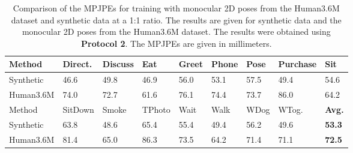 \begin{table}[]	
	\centering
	\begin{tabularx}{\textwidth}{l *{8}{Y}}
		\toprule
		Method & Direct. & Discuss & Eat & Greet & Phone & Pose & Purchase & Sit \\
		\midrule
		Synthetic & 46.6 & 49.8 & 46.9 & 56.0 & 53.1 & 57.5 & 49.4 & 54.6 \\
		Human3.6M & 74.0 & 72.7 & 61.6 & 76.1 & 74.4 & 73.7 & 86.0 & 64.2 \\
		\bottomrule
		\toprule
		Method & SitDown & Smoke & TPhoto & Wait & Walk & WDog & WTog. & \textbf{Avg.}\\
		\midrule
		Synthetic & 63.8 & 48.6 & 65.4 & 55.4 & 49.4 & 56.2 & 49.6 & \textbf{53.3} \\
		Human3.6M & 81.4 & 65.0 & 86.3 & 73.5 & 64.2 & 71.4 & 71.1 & \textbf{72.5} \\
		\bottomrule
	\end{tabularx}
	\caption{
		Comparison of the MPJPEs for training with monocular 2D poses from the Human3.6M dataset \cite{ionescu14} and synthetic data at a 1:1 ratio.
		The results are given for synthetic data and the monocular 2D poses from the Human3.6M dataset.
		The results were obtained using \textbf{Protocol 2}. The MPJPEs are given in millimeters.
	 }
	\label{tbl:results-real-and-synthetic-protocol2}
\end{table}